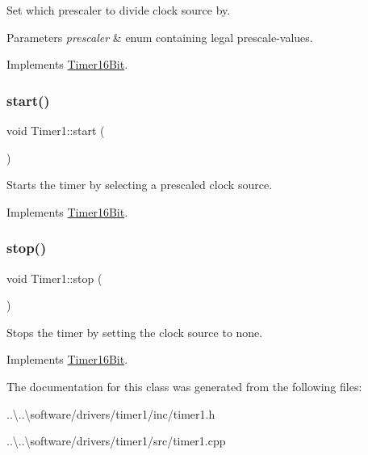 Set which prescaler to divide clock source by. 
\begin{DoxyParams}{Parameters}
{\em prescaler} & enum containing legal prescale-\/values. \\
\hline
\end{DoxyParams}


Implements \mbox{\hyperlink{class_timer16_bit}{Timer16\+Bit}}.

\mbox{\label{class_timer1_a29031bd6078a40cde7e782628b598035}} 
\subsubsection{\texorpdfstring{start()}{start()}}
{\footnotesize\ttfamily void Timer1\+::start (\begin{DoxyParamCaption}{ }\end{DoxyParamCaption})\hspace{0.3cm}{\ttfamily [virtual]}}

Starts the timer by selecting a prescaled clock source. 

Implements \mbox{\hyperlink{class_timer16_bit}{Timer16\+Bit}}.

\mbox{\label{class_timer1_ace3cab44330dd29aec8182f9a4dfa6f4}} 
\subsubsection{\texorpdfstring{stop()}{stop()}}
{\footnotesize\ttfamily void Timer1\+::stop (\begin{DoxyParamCaption}{ }\end{DoxyParamCaption})\hspace{0.3cm}{\ttfamily [virtual]}}

Stops the timer by setting the clock source to none. 

Implements \mbox{\hyperlink{class_timer16_bit}{Timer16\+Bit}}.



The documentation for this class was generated from the following files\+:\begin{DoxyCompactItemize}
\item 
..\textbackslash{}..\textbackslash{}software/drivers/timer1/inc/timer1.\+h\item 
..\textbackslash{}..\textbackslash{}software/drivers/timer1/src/timer1.\+cpp\end{DoxyCompactItemize}
